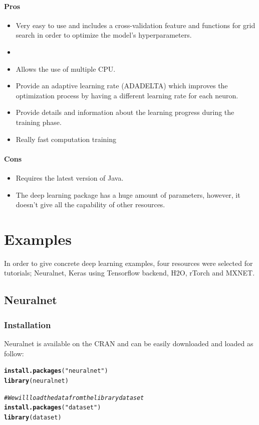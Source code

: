 \documentclass[letter]{article}\usepackage[]{graphicx}\usepackage[]{color}
\makeatletter
\newcommand{\hlstr}[1]{\textcolor[rgb]{0.192,0.494,0.8}{#1}}%
\newcommand{\hlcom}[1]{\textcolor[rgb]{0.678,0.584,0.686}{\textit{#1}}}%
\newcommand{\hlstd}[1]{\textcolor[rgb]{0.345,0.345,0.345}{#1}}%
\newcommand{\hlkwd}[1]{\textcolor[rgb]{0.737,0.353,0.396}{\textbf{#1}}}%
\newenvironment{kframe}{%
 \def\at@end@of@kframe{}%
 \ifinner\ifhmode%
  \def\at@end@of@kframe{\end{minipage}}%
  \begin{minipage}{\columnwidth}%
 \fi\fi%
 \def\FrameCommand##1{\hskip\@totalleftmargin \hskip-\fboxsep
 \colorbox{shadecolor}{##1}\hskip-\fboxsep
     \hskip-\linewidth \hskip-\@totalleftmargin \hskip\columnwidth}%
 \MakeFramed {\advance\hsize-\width
   \@totalleftmargin\z@ \linewidth\hsize
   \@setminipage}}%
 {\par\unskip\endMakeFramed%
 \at@end@of@kframe}
\newenvironment{knitrout}{}{} %
\makeatother
\begin{document}
\paragraph{Pros}
\begin{itemize}
\item Very easy to use and includes a cross-validation feature and functions for grid search in order to optimize the model's hyperparameters.
\item 
\item Allows the use of multiple CPU.
\item Provide an adaptive learning rate (ADADELTA) which improves the optimization process by having a different learning rate for each neuron.
\item Provide details and information about the learning progress during the training phase.
\item Really fast computation training
\end{itemize}
\paragraph{Cons}
\begin{itemize}
\item Requires the latest version of Java.
\item The deep learning package has a huge amount of parameters, however, it doesn't give all the capability of other resources.
\end{itemize}

\section{Examples}

\label{sec:examples}
In order to give concrete deep learning examples, four resources were selected for tutorials; Neuralnet, Keras using Tensorflow backend, H2O, rTorch and MXNET.
\subsection{Neuralnet}
\subsubsection{Installation}
Neuralnet is available on the CRAN and can be easily downloaded and loaded as follow:
\begin{knitrout}
\color{fgcolor}\begin{kframe}
\begin{alltt}
\hlkwd{install.packages}\hlstd{(}\hlstr{"neuralnet"}\hlstd{)}
\hlkwd{library}\hlstd{(neuralnet)}

\hlcom{# We will load the data from the library dataset}
\hlkwd{install.packages}\hlstd{(}\hlstr{"dataset"}\hlstd{)}
\hlkwd{library}\hlstd{(dataset)}
\end{alltt}
\end{kframe}
\end{knitrout}
\end{document}
